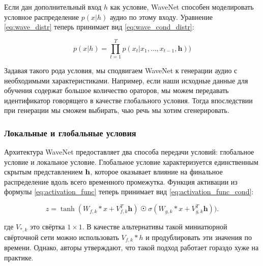 \documentclass[../diploma.tex]{subfiles}
\begin{document}
Если дан дополнительный вход $h$ как условие, WaveNet способен моделировать условное распределение $p(x|h)$ аудио по этому входу. Уравнение \ref{eq:wave_distr} теперь принимает вид \ref{eq:wave_cond_distr}:

\begin{equation} \label{eq:wave_cond_distr}
p(x|h) = \prod^{T}_{t=1}{p(x_{t}|x_1, \dots, x_{t-1}, \textbf{h}))}
\end{equation}

Задавая такого рода условия, мы сподвигаем WaveNet к генерации аудио с необходимыми характеристиками. Например, если наши исходные данные для обучения содержат большое количество ораторов, мы можем передавать идентификатор говорящего в качестве глобального условия. Тогда впоследствии при генерации мы сможем выбирать, чью речь мы хотим сгенерировать.


\subsubsection{Локальные и глобальные условия}
Архитектура WaveNet предоставляет два способа передачи условий: глобальное условие и локальное условие.
Глобальное условие характеризуется единственным скрытым представлением $\bf{h}$, которое оказывает влияние на
финальное распределение вдоль всего временного промежутка. 
Функция активации из формулы \ref{eq:activation_func} теперь принимает вид \ref{eq:activation_func_cond}:


\begin{equation} \label{eq:activation_func_cond}
z = \tanh(W_{f,k} * x + V_{f,k}^T \textbf{h})~\astrosun~\sigma (W_{g,k} * x + V_{g,k}^T \textbf{h})).
\end{equation}

где $V_{*,k}$ это свёртка $1 \times 1$. В качестве альтернативы такой миниатюрной свёрточной сети можно
использовать $V_{f,k} * h$ и продублировать эти значения по времени. Однако, авторы утверждают, 
что такой подход работает гораздо хуже на практике.  
\end{document}
